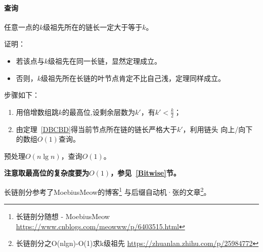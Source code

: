 \paragraph{查询}

\begin{theorem}\label{DBCBD}
	任意一点的$k$级祖先所在的链长一定大于等于$k$。
\end{theorem}
证明：
\begin{itemize}
	\item 若该点与$k$级祖先在同一长链，显然定理成立。
	\item 否则，$k$级祖先所在长链的叶节点肯定不比自己浅，定理同样成立。
\end{itemize}

步骤如下：
\begin{enumerate}
	\item 用倍增数组跳$k$的最高位,设剩余层数为$k'$，有$k'<\frac{k}{2}$；
	\item 由定理~\ref{DBCBD}得当前节点所在链的链长严格大于$k'$，利用链头
	      向上/向下的数组$O(1)$查询。
\end{enumerate}

预处理$O(n\lg n)$，查询$O(1)$。

{\bfseries 注意取最高位的复杂度要为$O(1)$，参见~\ref{Bitwise}节。}

长链剖分参考了MoebiusMeow的博客\footnote{长链剖分随想 - MoebiusMeow
	\url{https://www.cnblogs.com/meowww/p/6403515.html}
}
与后缀自动机·张的文章\footnote{长链剖分之O(nlgn)-O(1)求k级祖先
	\url{https://zhuanlan.zhihu.com/p/25984772}
}。
